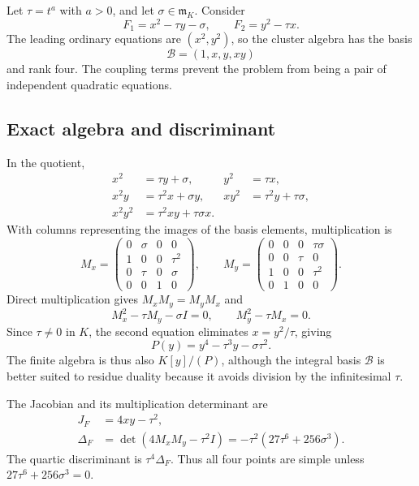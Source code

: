 \documentclass[11pt,letterpaper]{article}
\theoremstyle{definition}
\theoremstyle{remark}
\newcommand{\mm}{\mathfrak m}
\begin{document}
Let $\tau=t^a$ with $a>0$, and let $\sigma\in\mm_K$. Consider
\begin{equation}\label{eq:exampleF}
 F_1=x^2-\tau y-\sigma,\qquad
 F_2=y^2-\tau x.
\end{equation}
The leading ordinary equations are $(x^2,y^2)$, so the cluster algebra has the basis
\[
 \mathcal B=(1,x,y,xy)
\]
and rank four. The coupling terms prevent the problem from being a pair of independent quadratic equations.

\subsection{Exact algebra and discriminant}
In the quotient,
\begin{align*}
 x^2&=\tau y+\sigma,& y^2&=\tau x,\\
 x^2y&=\tau^2x+\sigma y,&
 xy^2&=\tau^2y+\tau\sigma,\\
 x^2y^2&=\tau^2xy+\tau\sigma x.
\end{align*}
With columns representing the images of the basis elements, multiplication is
\begin{equation}\label{eq:examplematrices}
 M_x=\begin{pmatrix}
 0&\sigma&0&0\\
 1&0&0&\tau^2\\
 0&\tau&0&\sigma\\
 0&0&1&0
 \end{pmatrix},\qquad
 M_y=\begin{pmatrix}
 0&0&0&\tau\sigma\\
 0&0&\tau&0\\
 1&0&0&\tau^2\\
 0&1&0&0
 \end{pmatrix}.
\end{equation}
Direct multiplication gives $M_xM_y=M_yM_x$ and
\[
 M_x^2-\tau M_y-\sigma I=0,\qquad
 M_y^2-\tau M_x=0.
\]
Since $\tau\ne0$ in $K$, the second equation eliminates $x=y^2/\tau$, giving
\begin{equation}\label{eq:quartic}
 P(y)=y^4-\tau^3y-\sigma\tau^2.
\end{equation}
The finite algebra is thus also $K[y]/(P)$, although the integral basis $\mathcal B$ is better suited to residue duality because it avoids division by the infinitesimal $\tau$.

The Jacobian and its multiplication determinant are
\begin{align}
 J_F&=4xy-\tau^2,\label{eq:examplejac}\\
 \Delta_F&=\det(4M_xM_y-\tau^2I)
       =-\tau^2(27\tau^6+256\sigma^3).\label{eq:exampledisc}
\end{align}
The quartic discriminant is $\tau^4\Delta_F$. Thus all four points are simple unless $27\tau^6+256\sigma^3=0$.
\end{document}
